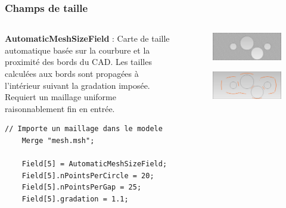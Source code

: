 \documentclass[aspectratio=169]{beamer}
\begin{document}
\begin{frame}[fragile]
\frametitle{Champs de taille}
\begin{columns}
  \begin{column}{0.55\textwidth}
    \footnotesize
    \textbf{AutomaticMeshSizeField} : Carte de taille automatique basée sur la courbure et la proximité des bords du CAD. Les tailles calculées aux bords sont propagées à l'intérieur suivant la gradation imposée. Requiert un maillage uniforme raisonnablement fin en entrée.
    \begin{lstlisting}[frame=none]
    // Importe un maillage dans le modele
    Merge "mesh.msh";

    Field[5] = AutomaticMeshSizeField;
    Field[5].nPointsPerCircle = 20;
    Field[5].nPointsPerGap = 25;
    Field[5].gradation = 1.1;
    \end{lstlisting}
  \end{column}
  \begin{column}{0.4\textwidth}
    \vspace{-0.7cm}
    \begin{figure}
      \includegraphics[width=1.02\textwidth]{figures/uniform.png}
      \caption{}
    \end{figure}
    \vspace{-2.3cm}
    \begin{figure}
      \includegraphics[width=1.02\textwidth]{figures/skeleton.png}
      \caption{}
    \end{figure}

\end{column}
\end{columns}
\end{frame}
\end{document}
